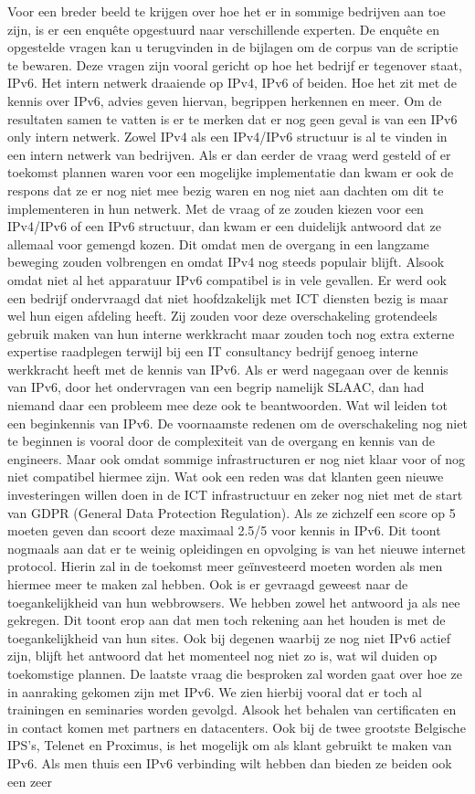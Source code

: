 Voor een breder beeld te krijgen over hoe het er in sommige bedrijven aan toe zijn, is er een enquête opgestuurd naar verschillende experten. De enquête en opgestelde vragen kan u terugvinden in de bijlagen om de corpus van de scriptie te bewaren. Deze vragen zijn vooral gericht op hoe het bedrijf er tegenover staat, IPv6. Het intern netwerk draaiende op IPv4, IPv6 of beiden. Hoe het zit met de kennis over IPv6, advies geven hiervan, begrippen herkennen en meer. Om de resultaten samen te vatten is er te merken dat er nog geen geval is van een IPv6 only intern netwerk. Zowel IPv4 als een IPv4/IPv6 structuur is al te vinden in een intern netwerk van bedrijven. Als er dan eerder de vraag werd gesteld of er toekomst plannen waren voor een mogelijke implementatie dan kwam er ook de respons dat ze er nog niet mee bezig waren en nog niet aan dachten om dit te implementeren in hun netwerk. Met de vraag of ze zouden kiezen voor een IPv4/IPv6 of een IPv6 structuur, dan kwam er een duidelijk antwoord dat ze allemaal voor gemengd kozen. Dit omdat men de overgang in een langzame beweging zouden volbrengen en omdat IPv4 nog steeds populair blijft. Alsook omdat niet al het apparatuur IPv6 compatibel is in vele gevallen. Er werd ook een bedrijf ondervraagd dat niet hoofdzakelijk met ICT diensten bezig is maar wel hun eigen afdeling heeft. Zij zouden voor deze overschakeling grotendeels gebruik maken van hun interne werkkracht maar zouden toch nog extra externe expertise raadplegen terwijl bij een IT consultancy bedrijf genoeg interne werkkracht heeft met de kennis van IPv6. Als er werd nagegaan over de kennis van IPv6, door het ondervragen van een begrip namelijk SLAAC, dan had niemand daar een probleem mee deze ook te beantwoorden. Wat wil leiden tot een beginkennis van IPv6. De voornaamste redenen om de overschakeling nog niet te beginnen is vooral door de complexiteit van de overgang en kennis van de engineers. Maar ook omdat sommige infrastructuren er nog niet klaar voor of nog niet compatibel hiermee zijn. Wat ook een reden was dat klanten geen nieuwe investeringen willen doen in de ICT infrastructuur en zeker nog niet met de start van GDPR (General Data Protection Regulation). Als ze zichzelf een score op 5 moeten geven dan scoort deze maximaal 2.5/5 voor kennis in IPv6. Dit toont nogmaals aan dat er te weinig opleidingen en opvolging is van het nieuwe internet protocol. Hierin zal in de toekomst meer geïnvesteerd moeten worden als men hiermee meer te maken zal hebben. Ook is er gevraagd geweest naar de toegankelijkheid van hun webbrowsers. We hebben zowel het antwoord ja als nee gekregen. Dit toont erop aan dat men toch rekening aan het houden is met de toegankelijkheid van hun sites. Ook bij degenen waarbij ze nog niet IPv6 actief zijn, blijft het antwoord dat het momenteel nog niet zo is, wat wil duiden op toekomstige plannen. De laatste vraag die besproken zal worden gaat over hoe ze in aanraking gekomen zijn met IPv6. We zien hierbij vooral dat er toch al trainingen en seminaries worden gevolgd. Alsook het behalen van certificaten en in contact komen met partners en datacenters. Ook bij de twee grootste Belgische IPS’s, Telenet en Proximus, is het mogelijk om als klant gebruikt te maken van IPv6. Als men thuis een IPv6 verbinding wilt hebben dan bieden ze beiden ook een zeer 